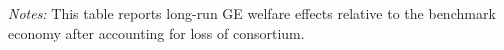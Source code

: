 \documentclass[parskip=full]{article}
\theoremstyle{plain}
\theoremstyle{definition}
\theoremstyle{remark}
\newenvironment{fignote2}[1]
{
\par
\medskip
\begin{minipage}{#1}
\footnotesize
}
{
\end{minipage}
}
\begin{document}
\begin{table}[H]
    \centering
    \vspace{-0.5cm}
    
    \vspace{-0.5cm}
    \begin{fignote2}{0.91\textwidth}
    \textit{Notes:} This table reports long-run GE welfare effects relative to the benchmark economy after accounting for loss of consortium. 
    \end{fignote2}
\end{table}


\clearpage


\end{document}
